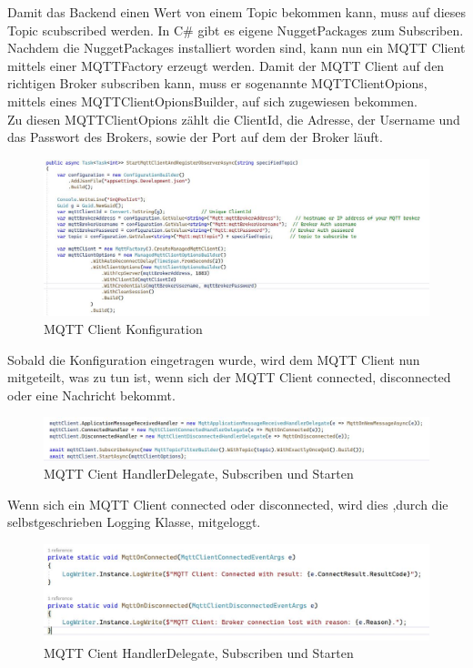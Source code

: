 Damit das Backend einen Wert von einem Topic bekommen kann, muss auf dieses Topic scubscribed werden.
In C\# gibt es eigene NuggetPackages zum Subscriben. \\
Nachdem die NuggetPackages installiert worden sind,
kann nun ein MQTT Client mittels einer MQTTFactory erzeugt werden. Damit der MQTT Client auf den richtigen
Broker subscriben kann, muss er sogenannte MQTTClientOpions, mittels eines MQTTClientOpionsBuilder, auf sich zugewiesen bekommen.
\\Zu diesen MQTTClientOpions zählt die ClientId, die Adresse, der Username und das Passwort des Brokers, sowie
der Port auf dem der Broker läuft.
\begin{figure}[H]
    \centering
    \includegraphics[width=1.3\textwidth]{pics/StartMqttClientConnections.JPG}  
    \caption{MQTT Client Konfiguration}
\end{figure}
Sobald die Konfiguration eingetragen wurde, wird dem MQTT Client nun mitgeteilt, was zu tun ist, 
wenn sich der MQTT Client connected, disconnected oder eine Nachricht bekommt.

\begin{figure}[H]
    \centering
    \includegraphics[width=1.3\textwidth]{pics/StartMqttClientCallMethods.JPG}  
    \caption{MQTT Cient HandlerDelegate, Subscriben und Starten}
\end{figure}

Wenn sich ein MQTT Client connected oder disconnected, wird dies 
,durch die selbstgeschrieben Logging Klasse, mitgeloggt.

\begin{figure}[H]
    \centering
    \includegraphics[width=1.1\textwidth]{pics/StartMqttClientConnectAndDisconnect.JPG}  
    \caption{MQTT Cient HandlerDelegate, Subscriben und Starten}
\end{figure}

